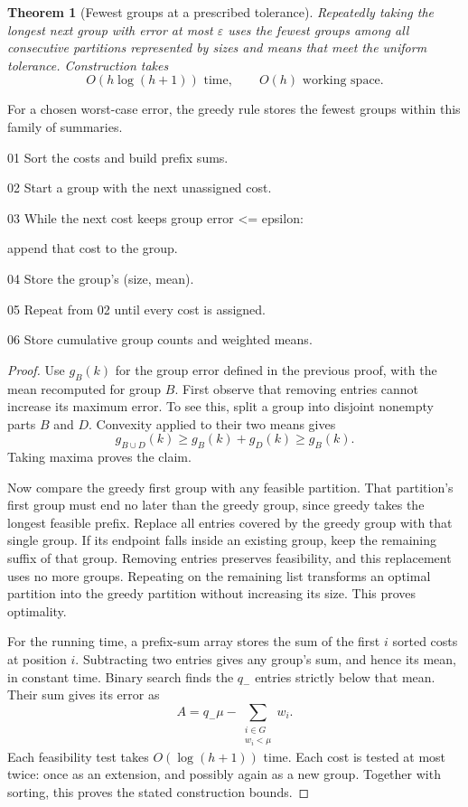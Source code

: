 \documentclass[11pt]{article}
\newtheorem{theorem}{Theorem}
\begin{document}
\begin{theorem}[Fewest groups at a prescribed tolerance]\label{thm:greedy}
Repeatedly taking the longest next group with error at most $\varepsilon$
uses the fewest groups among all consecutive partitions represented by
sizes and means that meet the uniform tolerance. Construction takes
\[
 O(h\log(h+1))\text{ time},\qquad O(h)\text{ working space}.
\]
\end{theorem}
\begin{takeaway}
For a chosen worst-case error, the greedy rule stores the fewest groups
within this family of summaries.
\end{takeaway}
\begin{algorithm}
01 Sort the costs and build prefix sums.\par
02 Start a group with the next unassigned cost.\par
03 While the next cost keeps group error <= epsilon:\par
\hspace*{5mm}append that cost to the group.\par
04 Store the group's (size, mean).\par
05 Repeat from 02 until every cost is assigned.\par
06 Store cumulative group counts and weighted means.
\end{algorithm}
\begin{proof}
Use $g_B(k)$ for the group error defined in the previous proof, with the
mean recomputed for group $B$. First observe that removing entries cannot increase its
maximum error. To see this, split a group into disjoint nonempty parts
$B$ and $D$. Convexity applied to their two means gives
\[
 g_{B\cup D}(k)\ge g_B(k)+g_D(k)\ge g_B(k).
\]
Taking maxima proves the claim.

Now compare the greedy first group with any feasible partition. That
partition's first group must end no later than the greedy group, since
greedy takes the longest feasible prefix. Replace all entries covered by
the greedy group with that single group. If its endpoint falls inside an
existing group, keep the remaining suffix of that group. Removing entries
preserves feasibility, and this replacement uses no more groups. Repeating
on the remaining list transforms an optimal partition into the greedy
partition without increasing its size. This proves optimality.

For the running time, a prefix-sum array stores the sum of the first $i$
sorted costs at position $i$. Subtracting two entries gives any group's
sum, and hence its mean, in constant time.
Binary search finds the $q_-$ entries strictly below that mean. Their sum
gives its error as
\[
 A=q_-\mu-\sum_{\substack{i\in G\\w_i<\mu}}w_i.
\]
Each feasibility test takes $O(\log(h+1))$ time. Each cost is tested at
most twice: once as an extension, and possibly again as a new group.
Together with sorting, this proves the stated construction bounds.
\end{proof}
\end{document}
